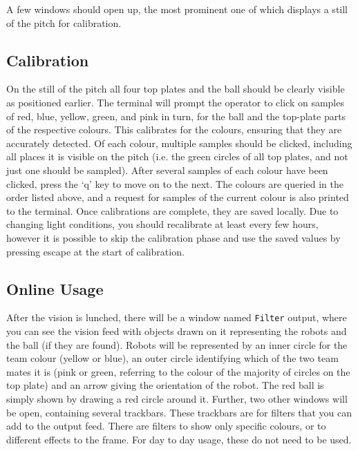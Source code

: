 A few windows should open up, the most prominent one of which displays a still
of the pitch for calibration.

\subsection{Calibration}

On the still of the pitch all four top plates and the ball should be clearly
visible as positioned earlier. The terminal will prompt the operator to click
on samples of red, blue, yellow, green, and pink in turn, for the ball and the
top-plate parts of the respective colours. This calibrates for the colours,
ensuring that they are accurately detected. Of each colour, multiple samples
should be clicked, including all places it is visible on the pitch (i.e. the
green circles of all top plates, and not just one should be sampled). After
several samples of each colour have been clicked, press the `q' key to move on
to the next. The colours are queried in the order listed above, and a request
for samples of the current colour is also printed to the terminal. Once
calibrations are complete, they are saved locally. Due to changing light
conditions, you should recalibrate at least every few hours, however it is
possible to skip the calibration phase and use the saved values by pressing
escape at the start of calibration.

\subsection{Online Usage}

After the vision is lunched, there will be a window named \texttt{Filter}
output, where you can see the vision feed with objects drawn on it representing
the robots and the ball (if they are found).  Robots will be represented by an
inner circle for the team colour (yellow or blue), an outer circle identifying
which of the two team mates it is (pink or green, referring to the colour of
the majority of circles on the top plate) and an arrow giving the orientation
of the robot. The red ball is simply shown by drawing a red circle around it.
Further, two other windows will be open, containing several trackbars. These
trackbars are for filters that you can add to the output feed. There are
filters to show only specific colours, or to different effects to the frame.
For day to day usage, these do not need to be used.

